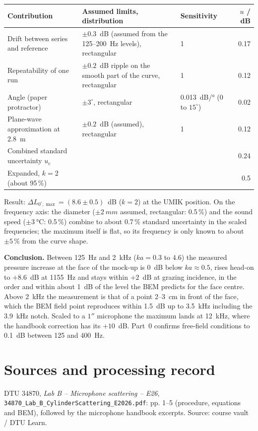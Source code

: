 \documentclass[a4paper,10pt]{article}
\newcommand{\file}[1]{\nolinkurl{#1}}
\begin{document}
\begin{tabularx}{\linewidth}{@{}lXlr@{}}\toprule
Contribution & Assumed limits, distribution & Sensitivity & $u$ / dB \\\midrule
Drift between series and reference & $\pm0.3$~dB (assumed from the 125--\SI{200}{Hz} levels), rectangular & 1 & 0.17 \\
Repeatability of one run & $\pm0.2$~dB ripple on the smooth part of the curve, rectangular & 1 & 0.12 \\
Angle (paper protractor) & $\pm3^\circ$, rectangular & \SI{0.013}{dB/\degree} (0 to $15^\circ$) & 0.02 \\
Plane-wave approximation at \SI{2.8}{m} & $\pm0.2$~dB (assumed), rectangular & 1 & 0.12 \\\midrule
Combined standard uncertainty $u_c$ & & & 0.24 \\
Expanded, $k=2$ (about 95\,\%) & & & 0.5 \\\bottomrule
\end{tabularx}\par\smallskip
Result: $\Delta L_{0^\circ,\max}=(8.6\pm0.5)$~dB ($k=2$) at the UMIK position. On the
frequency axis: the diameter ($\pm\SI{2}{mm}$ assumed, rectangular: 0.5\,\%) and the sound
speed ($\pm\SI{3}{\celsius}$: 0.5\,\%) combine to about 0.7\,\% standard uncertainty in
the scaled frequencies; the maximum itself is flat, so its frequency is only known to
about $\pm5$\,\% from the curve shape.

\textbf{Conclusion.} Between \SI{125}{Hz} and \SI{2}{kHz} ($ka=0.3$ to $4.6$) the
measured pressure increase at the face of the mock-up is \SI{0}{dB} below $ka\approx0.5$,
rises head-on to $+8.6$~dB at \SI{1155}{Hz} and stays within $+2$~dB at grazing
incidence, in the order and within about \SI{1}{dB} of the level the BEM predicts for
the face centre. Above \SI{2}{kHz} the measurement is that of a point 2--\SI{3}{cm} in
front of the face, which the BEM field point reproduces within \SI{1.5}{dB} up to
\SI{3.5}{kHz} including the \SI{3.9}{kHz} notch. Scaled to a $1''$ microphone the
maximum lands at \SI{12}{kHz}, where the handbook correction has its $+10$~dB. Part~0
confirms free-field conditions to \SI{0.1}{dB} between 125 and \SI{400}{Hz}.

\section*{Sources and processing record}
\small
DTU 34870, \emph{Lab B -- Microphone scattering -- E26},
\file{34870_Lab_B_CylinderScattering_E2026.pdf}: pp. 1--5 (procedure, equations and
BEM), followed by the microphone handbook excerpts. Source: course vault / DTU Learn.
\end{document}
